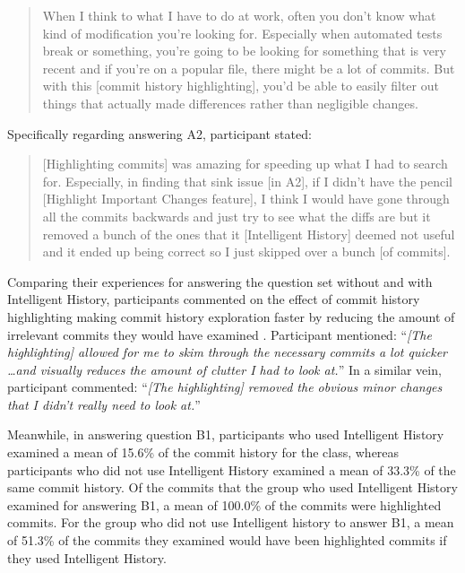 \begin{quote}
  When I think to what I have to do at work, 
  often you don’t know what kind of modification you’re looking for. 
  Especially when automated tests break or something, 
  you’re going to be looking for something that is very recent and if you’re on a popular file, 
  there might be a lot of commits. 
  But with this [commit history highlighting], 
  you’d be able to easily filter out things that actually made differences rather than negligible changes.
\end{quote}

Specifically regarding answering A2, participant  stated:

\begin{quote}
  [Highlighting commits] was amazing for speeding up what I had to search for. 
  Especially, in finding that sink issue [in A2], if I didn’t have the pencil [Highlight Important Changes feature], 
  I think I would have gone through all the commits backwards and just try to see what the diffs are 
  but it removed a bunch of the ones that it [Intelligent History] deemed not useful and it ended up being correct so I just skipped over a bunch [of commits].
\end{quote}

Comparing their experiences for answering the question set without and with Intelligent History, 
participants commented on the effect of commit history highlighting making commit history exploration faster by reducing the amount of irrelevant commits they would have examined .
Participant  mentioned: 
``\textit{[The highlighting] allowed for me to skim through the necessary commits a lot quicker \dots and visually reduces the amount of clutter I had to look at.}''
In a similar vein, participant  commented:
``\textit{[The highlighting] removed the obvious minor changes that I didn’t really need to look at.}''

Meanwhile, in answering question B1, participants who used Intelligent History examined a mean of 15.6\% of the commit history for the  class,
whereas participants who did not use Intelligent History examined a mean of 33.3\% of the same commit history.
Of the commits that the group who used Intelligent History examined for answering B1, a mean of 100.0\% of the commits were highlighted commits.
For the group who did not use Intelligent history to answer B1, a mean of 51.3\% of the commits they examined would have been highlighted commits if they used Intelligent History.

